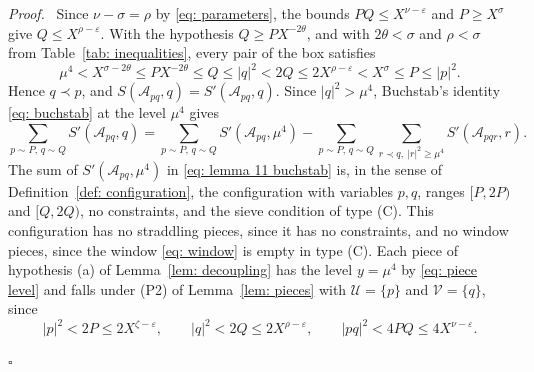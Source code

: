 \documentclass{article}
\numberwithin{equation}{section}
\newenvironment{proof}[1][Proof]{\par\medskip\noindent\textit{#1.}\ }{\hfill$\square$\par\medskip}
\newcommand{\Le}{\leqslant}
\newcommand{\Ge}{\geqslant}
\begin{document}
\begin{proof}
Since $\nu - \sigma = \rho$ by \eqref{eq: parameters}, the bounds $PQ \Le X^{\nu - \varepsilon}$ and $P \Ge X^{\sigma}$ give $Q \Le X^{\rho - \varepsilon}$. With the hypothesis $Q \Ge P X^{-2\theta}$, and with $2\theta < \sigma$ and $\rho < \sigma$ from Table~\ref{tab: inequalities}, every pair of the box satisfies
\begin{equation*}
\mu^4 < X^{\sigma - 2\theta} \Le P X^{-2\theta} \Le Q \Le |q|^2 < 2Q \Le 2X^{\rho - \varepsilon} < X^{\sigma} \Le P \Le |p|^2.
\end{equation*}
Hence $q \prec p$, and $S(\mathcal{A}_{pq}, q) = S'(\mathcal{A}_{pq}, q)$. Since $|q|^2 > \mu^4$, Buchstab's identity \eqref{eq: buchstab} at the level $\mu^4$ gives
\begin{equation}
\label{eq: lemma 11 buchstab}
\sum_{p \sim P,\, q \sim Q} S'(\mathcal{A}_{pq}, q) = \sum_{p \sim P,\, q \sim Q} S'(\mathcal{A}_{pq}, \mu^4) - \sum_{p \sim P,\, q \sim Q} \sum_{r \prec q,\ |r|^2 \Ge \mu^4} S'(\mathcal{A}_{pqr}, r).
\end{equation}
The sum of $S'(\mathcal{A}_{pq}, \mu^4)$ in \eqref{eq: lemma 11 buchstab} is, in the sense of Definition~\ref{def: configuration}, the configuration with variables $p, q$, ranges $[P, 2P)$ and $[Q, 2Q)$, no constraints, and the sieve condition of type (C). This configuration has no straddling pieces, since it has no constraints, and no window pieces, since the window \eqref{eq: window} is empty in type (C). Each piece of hypothesis (a) of Lemma~\ref{lem: decoupling} has the level $y = \mu^4$ by \eqref{eq: piece level} and falls under (P2) of Lemma~\ref{lem: pieces} with $\mathcal{U} = \{p\}$ and $\mathcal{V} = \{q\}$, since
\begin{equation*}
|p|^2 < 2P \Le 2X^{\zeta - \varepsilon}, \qquad |q|^2 < 2Q \Le 2X^{\rho - \varepsilon}, \qquad |pq|^2 < 4PQ \Le 4X^{\nu - \varepsilon}.
\end{equation*}


\end{proof}
\end{document}
